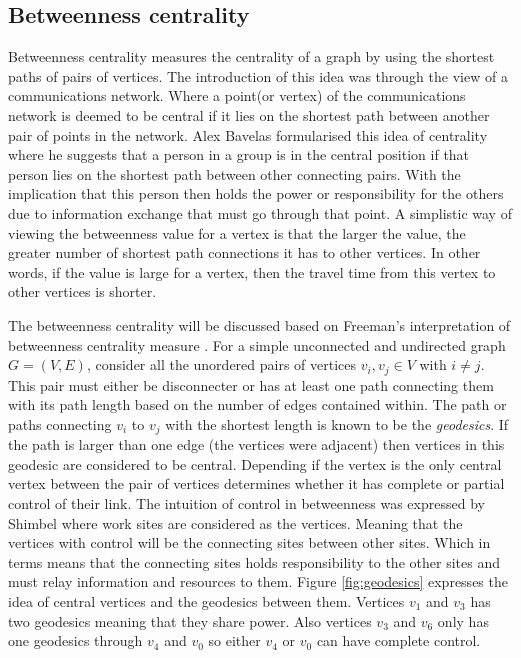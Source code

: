 \subsection{Betweenness centrality}
Betweenness centrality measures the centrality of a graph by using the shortest paths of pairs of vertices. The introduction of this idea was through the view of a communications network. Where a point(or vertex) of the communications network is deemed to be central if it lies on the shortest path between another pair of points in the network. Alex Bavelas \cite{bavelas1948mathematical} formularised this idea of centrality where he suggests that a person in a group is in the central position if that person lies on the shortest path between other connecting pairs. With the implication that this person then holds the power or responsibility for the others due to information exchange that must go through that point. A simplistic way of viewing the betweenness value for a vertex is that the larger the value, the greater number of shortest path connections it has to other vertices. In other words, if the value is large for a vertex, then the travel time from this vertex to other vertices is shorter. 

The betweenness centrality will be discussed based on Freeman's interpretation of betweenness centrality measure \cite{freeman1977set}. For a simple unconnected and undirected graph $G = (V, E)$, consider all the unordered pairs of vertices $v_i, v_j \in V$ with $i \ne j$. This pair must either be disconnecter or has at least one path connecting them with its path length based on the number of edges contained within. The path or paths connecting $v_i$ to $v_j$ with the shortest length is known to be the \emph{geodesics}. If the path is larger than one edge (the vertices were adjacent) then vertices in this geodesic are considered to be central. Depending if the vertex is the only central vertex between the pair of vertices determines whether it has complete or partial control of their link. The intuition of control in betweenness was expressed by Shimbel \cite{shimbel1953structural} where work sites are considered as the vertices. Meaning that the vertices with control will be the connecting sites between other sites. Which in terms means that the connecting sites holds responsibility to the other sites and must relay information and resources to them. Figure \ref{fig:geodesics} expresses the idea of central vertices and the geodesics between them. Vertices $v_1$ and $v_3$ has two geodesics meaning that they share power. Also vertices $v_3$ and $v_6$ only has one geodesics through $v_4$ and $v_0$ so either $v_4$ or $v_0$ can have complete control.

